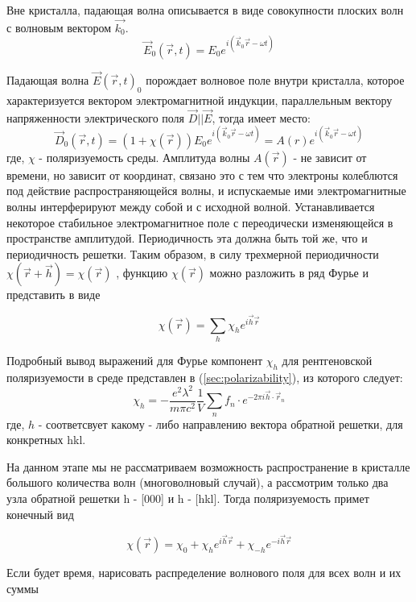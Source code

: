 
Вне кристалла, падающая волна описывается в виде совокупности плоских волн с волновым вектором  $\vec{k_0}$.
\begin{equation}
  \vec{E}_0(\vec{r},t) = E_0 e^{i(\vec{k}_0\vec{r}-\omega t)}
 \end{equation}

Падающая волна $\vec{E}(\vec{r},t)_0$ порождает волновое поле внутри кристалла, которое характеризуется вектором
электромагнитной индукции, параллельным вектору напряженности электрического поля $\vec{D}||\vec{E}$, тогда
имеет место:
\begin{equation}
 \vec{D}_0(\vec{r},t) = (1+\chi(\vec{r})) E_0 e^{i(\vec{k}_0\vec{r}-\omega t)} = A(r) e^{i(\vec{k}_0\vec{r}-\omega t)}
\end{equation}
 \noindent
где, $\chi$ - поляризуемость среды. Амплитуда волны $A(\vec{r})$ - не зависит
от времени, но зависит от координат, связано
это с тем что электроны колеблются под действие распространяющейся волны, и испускаемые ими
электромагнитные волны интерферируют между собой и с исходной волной. Устанавливается некоторое стабильное
электромагнитное поле с переодически изменяющейся в пространстве амплитудой. Периодичность эта должна быть
той же, что и периодичность решетки. Таким образом, в силу трехмерной периодичности $\chi(\vec{r}+\vec{h}) = \chi(\vec{r})$
, функцию $\chi(\vec{r})$ можно разложить в ряд Фурье и представить в виде

\begin{equation}
\chi(\vec{r}) = \sum_{h}\chi_h e^{i\vec{h}\vec{r}}
\end{equation}

Подробный вывод выражений для Фурье компонент $\chi_h$ для рентгеновской поляризуемости
 в среде представлен в (\ref{sec:polarizability}), из которого следует:
\begin{equation}
\chi_h = -\frac{e^2 \lambda^2}{m \pi c^2} \frac{1}{V} \sum_{n} f_n \cdot e^{-2\pi i\vec{h}\cdot \vec{r}_n}
\end{equation}
\noindent
где, $h$ - соответсвует какому - либо направлению вектора обратной решетки, для конкретных {hkl}.

На данном этапе мы не рассматриваем возможность распространение в кристалле большого количества
волн (многоволновый случай), а рассмотрим только два узла обратной решетки h - [000] и h - [hkl].
Тогда поляризуемость примет конечный вид

\begin{equation}
\chi(\vec{r}) = \chi_0 + \chi_h e^{i\vec{h}\vec{r}} + \chi_{-h} e^{-i\vec{h}\vec{r}}
\end{equation}

\textcolor{mygreen}{Если будет время, нарисовать распределение волнового поля для всех волн и их суммы}
